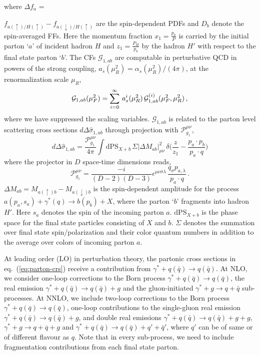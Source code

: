 \documentclass[%
 twocolumn,
 superscriptaddress,
 preprintnumbers,
 nofootinbib,
 amsmath,amssymb,
 aps,
 prl,
]{revtex4}
\begin{document}
%
where $\Delta f_a$ = {$f_{a(\uparrow)/H(\uparrow)}
-f_{a(\downarrow)/H(\uparrow)} $ are the spin-dependent PDFs
and $D_b$ denote the spin-averaged FFs. 
Here the momentum fraction $x_1=\frac{p_a}{P}$ is carried by the initial parton `$a$' of incident hadron $H$ and $z_1=\frac{P_H}{p_b}$ by the hadron $H'$ with respect to the final state parton `$b$'.
The CFs $\mathcal{G}_{1,ab}$ are computable in perturbative QCD  
in powers of the strong coupling, $a_s(\mu_R^2) = {\alpha_s(\mu_R^2)}/(4\pi)$,
at the renormalization scale $\mu_R$,
%
\begin{equation}    
\label{eq:as-exp}
{\cal G}_{1,ab}(\mu_F^2) = \sum_{i=0}^\infty\, a_s^i(\mu_R^2)\, {\cal G}_{1,ab}^{(i)}(\mu_F^2,\mu_R^2)
\, ,
\end{equation}
%
where we have suppressed the scaling variables. 
$\mathcal{G}_{1,ab}$ is related to the parton level scattering cross sections  $d{\Delta \hat \sigma}_{1,ab}$ through projection with $\mathcal{P}^{\mu\nu}_{g_1}$, 
%
\begin{equation}
\label{eq:parton-crs}
d{\Delta \hat \sigma}_{1,ab} = \frac{\mathcal{P}_{g_1}^{\mu\nu}}{4\pi}\int \text{dPS}_{X+b}\, {\Sigma}|{\Delta M}_{ab}|^{2}_{\mu\nu}\, \delta\Big(\frac{z}{z_1}-\frac{p_a \cdot p_b}{p_a\cdot q}\Big) 
\end{equation}
% 
where the projector in $D$ space-time dimensions reads, 
%
\begin{equation}
\mathcal{P}^{\mu\nu}_{g_1}= \frac{-i}{(D-2)(D-3)}
\epsilon^{\mu \nu \sigma \lambda} \,  \frac{q_\sigma p_{a,\lambda}}{p_a\cdot q} 
\, .
\end{equation}
%
$\Delta M_{ab} = M_{a(\uparrow)b}-M_{a(\downarrow)b}$  is the spin-dependent amplitude for the process $a(p_a,s_a)+\gamma^{*}(q)\rightarrow b(p_b) + X $, 
where the parton `$b$' fragments into hadron $H'$.  Here $s_a$ denotes the spin of the incoming parton $a$.  $\text{dPS}_{X+b}$ is the phase space for the final state particles consisting of $X$ and $b$.  
${\Sigma}$ denotes the summation over final state spin/polarization and their color quantum numbers 
in addition to the average over colors of incoming parton $a$.


At leading order (LO) in perturbation theory, the partonic cross sections in eq.~(\ref{eq:parton-crs}) receive a contribution from $\gamma^*+q (\bar{q}) \rightarrow q (\bar{q})$.  
At NLO, we consider one-loop corrections to the Born process $\gamma^*+q (\bar{q}) \rightarrow q (\bar{q})$, the real emission  $\gamma^* + q (\bar{q}) \rightarrow q (\bar{q}) + g$ 
and the gluon-initiated  $\gamma^* + g \rightarrow q + \bar{q}$ sub-processes.  
At NNLO, we include 
two-loop corrections to the Born process $\gamma^* + q(\bar{q}) \rightarrow q(\bar{q})$,
one-loop contributions to the single-gluon real emission $\gamma^* + q (\bar{q}) \rightarrow q (\bar{q}) + g$, 
and double real emissions $\gamma^* + q(\bar{q}) \rightarrow q(\bar{q}) + g + g$,
$\gamma^*+ g \rightarrow q + \overline q +g$ and
$\gamma^* + q(\bar{q}) \rightarrow q(\bar{q}) + q' + \bar{q}'$, 
where $q'$ can be of same or of different flavour as $q$.  
Note that in every sub-process, we need to include fragmentation contributions from each final state parton.


}
\end{document}

